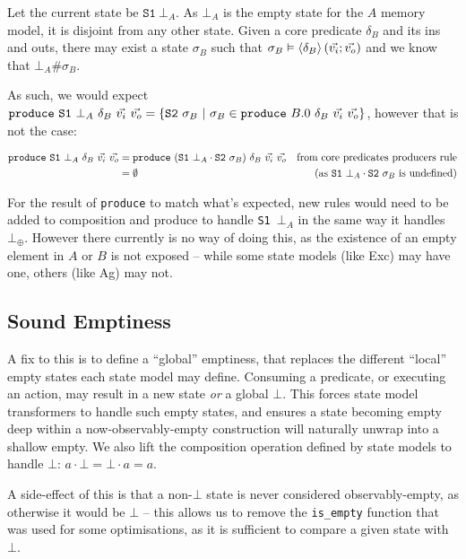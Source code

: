 \documentclass[,a4paper,oneside]{article}
\newcommand{\code}[1]{\texttt{#1}}
\begin{document}
Let the current state be $\code{S1}~\bot_A$. As $\bot_A$ is the empty state for the $A$ memory model, it is disjoint from any other state. Given a core predicate $\delta_B$ and its ins and outs, there may exist a state $\sigma_B$ such that $\sigma_B\vDash \left<\texttt{$\delta_B$}\right>(\vec{v_i};\vec{v_o})$ and we know that $\bot_A \# \sigma_B$. 

As such, we would expect $\code{produce}~\code{S1}~\bot_A~\delta_B~\ins~\outs = \{\code{S2}~\sigma_B~|~\sigma_B\in \code{produce}~B.0~ \delta_B~\ins~\outs \}$, however that is not the case:

\begin{align*}
	\code{produce}~\code{S1}~\bot_A~\delta_B~\ins~\outs
	&=\code{produce}~(\code{S1}~\bot_A\cdot\code{S2}~\sigma_B)~\delta_B~\ins~\outs&\text{from core predicates producers rule}\\
	&=\emptyset &\text{(as }\code{S1}~\bot_A\cdot\code{S2}~\sigma_B\text{ is undefined)}
\end{align*}

For the result of \code{produce} to match what's expected, new rules would need to be added to composition and produce to handle \code{S1~$\bot_A$} in the same way it handles $\bot_\oplus$. However there currently is no way of doing this, as the existence of an empty element in $A$ or $B$ is not exposed -- while some state models (like Exc) may have one, others (like Ag) may not.

\subsection{Sound Emptiness}

A fix to this is to define a ``global'' emptiness, that replaces the different ``local'' empty states each state model may define. Consuming a predicate, or executing an action, may result in a new state {\it or} a global $\bot$. This forces state model transformers to handle such empty states, and ensures a state becoming empty deep within a now-observably-empty construction will naturally unwrap into a shallow empty. We also lift the composition operation defined by state models to handle $\bot$: $a \cdot \bot = \bot \cdot a = a$.

A side-effect of this is that a non-$\bot$ state is never considered observably-empty, as otherwise it would be $\bot$ -- this allows us to remove the \code{is\_empty} function that was used for some optimisations, as it is sufficient to compare a given state with $\bot$.
\end{document}
